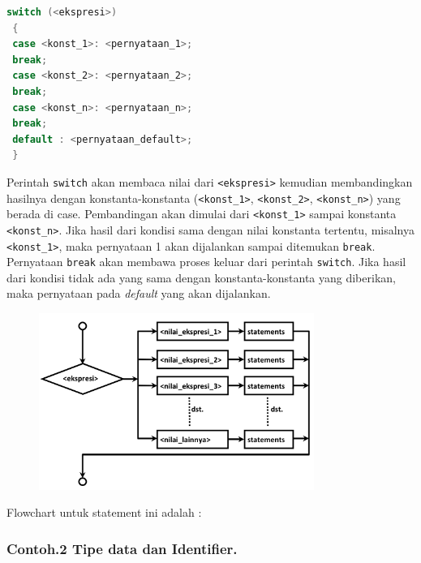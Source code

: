 \begin{lstlisting}[language=c++]
 switch (<ekspresi>)
 {
 case <konst_1>: <pernyataan_1>;
 break;
 case <konst_2>: <pernyataan_2>;
 break;
 case <konst_n>: <pernyataan_n>;
 break;
 default : <pernyataan_default>;
 }
\end{lstlisting}

Perintah \texttt{switch} akan membaca nilai dari
\texttt{\textless{}ekspresi\textgreater{}} kemudian membandingkan
hasilnya dengan konstanta-konstanta
(\texttt{\textless{}konst\_1\textgreater{}},
\texttt{\textless{}konst\_2\textgreater{}},
\texttt{\textless{}konst\_n\textgreater{}}) yang berada di case.
Pembandingan akan dimulai dari
\texttt{\textless{}konst\_1\textgreater{}} sampai konstanta
\texttt{\textless{}konst\_n\textgreater{}}. Jika hasil dari kondisi sama
dengan nilai konstanta tertentu, misalnya
\texttt{\textless{}konst\_1\textgreater{}}, maka pernyataan 1 akan
dijalankan sampai ditemukan \texttt{break}. Pernyataan \texttt{break}
akan membawa proses keluar dari perintah \texttt{switch}. Jika hasil
dari kondisi tidak ada yang sama dengan konstanta-konstanta yang
diberikan, maka pernyataan pada \emph{default} yang akan dijalankan.

\begin{figure}[htbp]
\centering
\includegraphics[width=0.8\textwidth]{images/capture2-3.png}
\caption{}
\end{figure}

Flowchart untuk statement ini adalah :

\subsubsection{Contoh.2 Tipe data dan Identifier.}

